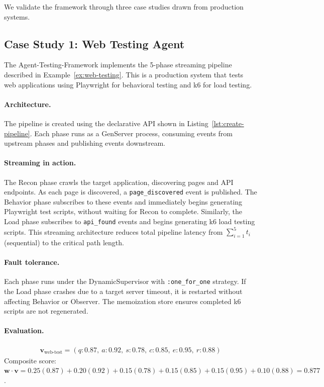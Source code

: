 \documentclass[12pt,a4paper]{article}
\theoremstyle{definition}
\theoremstyle{remark}
\begin{document}
We validate the framework through three case studies drawn from production systems.

\subsection{Case Study 1: Web Testing Agent}

The Agent-Testing-Framework implements the 5-phase streaming pipeline described in Example~\ref{ex:web-testing}. This is a production system that tests web applications using Playwright for behavioral testing and k6 for load testing.

\paragraph{Architecture.} The pipeline is created using the declarative API shown in Listing~\ref{lst:create-pipeline}. Each phase runs as a GenServer process, consuming events from upstream phases and publishing events downstream.

\paragraph{Streaming in action.} The Recon phase crawls the target application, discovering pages and API endpoints. As each page is discovered, a \texttt{page\_discovered} event is published. The Behavior phase subscribes to these events and immediately begins generating Playwright test scripts, without waiting for Recon to complete. Similarly, the Load phase subscribes to \texttt{api\_found} events and begins generating k6 load testing scripts. This streaming architecture reduces total pipeline latency from $\sum_{i=1}^{5} t_i$ (sequential) to the critical path length.

\paragraph{Fault tolerance.} Each phase runs under the DynamicSupervisor with \texttt{:one\_for\_one} strategy. If the Load phase crashes due to a target server timeout, it is restarted without affecting Behavior or Observer. The memoization store ensures completed k6 scripts are not regenerated.

\paragraph{Evaluation.}
\begin{align*}
  \mathbf{v}_{\text{web-test}} = (q: 0.87,\ a: 0.92,\ s: 0.78,\ c: 0.85,\ e: 0.95,\ r: 0.88)
\end{align*}
Composite score: $\mathbf{w} \cdot \mathbf{v} = 0.25(0.87) + 0.20(0.92) + 0.15(0.78) + 0.15(0.85) + 0.15(0.95) + 0.10(0.88) = 0.877$.
\end{document}
